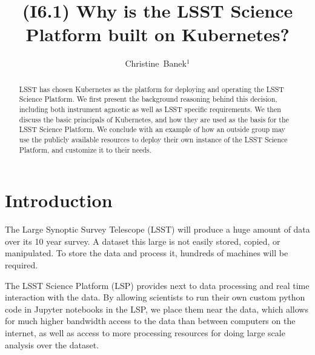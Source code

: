 \documentclass[11pt,twoside]{article}
\begin{document}
\title{(I6.1) Why is the LSST Science Platform built on Kubernetes?}


\author{Christine~Banek$^1$}





\begin{abstract}
LSST has chosen Kubernetes as the platform for deploying and
operating the LSST Science Platform.  We first present the
background reasoning behind this decision, including both
instrument agnostic as well as LSST specific requirements.
We then discuss the basic principals of Kubernetes, and how
they are used as the basis for the LSST Science Platform.
We conclude with an example of how an outside group may
use the publicly available resources to deploy their own
instance of the LSST Science Platform, and customize it
to their needs.
\end{abstract}

\section{Introduction}

The Large Synoptic Survey Telescope (LSST) will produce a huge amount
of data over its 10 year survey. A dataset this large is not easily stored,
copied, or manipulated.  To store the data and process it, hundreds of
machines will be required.

The LSST Science Platform (LSP) provides next to data processing and real
time interaction with the data.  By allowing scientists to run their own
custom python code in Jupyter notebooks in the LSP, we place them near the data,
which allows for much higher bandwidth access to the data than between
computers on the internet, as well as access to more processing
resources for doing large scale analysis over the dataset.
\end{document}

